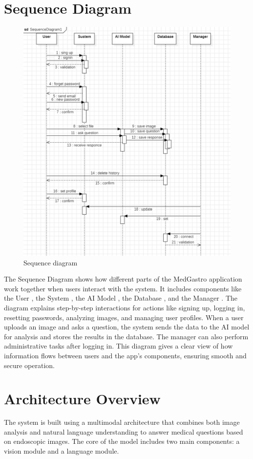 \documentclass[12pt,a4paper]{report}
\begin{document}
\section{Sequence Diagram}
\begin{figure}[H]
    \centering
    \includegraphics[width=1\linewidth]{SequenceDiagram.png}
    \caption{Sequence diagram}
    \label{fig:enter-label}
\end{figure}

The Sequence Diagram shows how different parts of the MedGastro application work together when users interact with the system. It includes components like the User , the System , the AI Model , the Database , and the Manager . The diagram explains step-by-step interactions for actions like signing up, logging in, resetting passwords, analyzing images, and managing user profiles. When a user uploads an image and asks a question, the system sends the data to the AI model for analysis and stores the results in the database. The manager can also perform administrative tasks after logging in. This diagram gives a clear view of how information flows between users and the app's components, ensuring smooth and secure operation. 

\section{Architecture Overview}
The system is built using a multimodal architecture that combines both image analysis and natural language understanding to answer medical questions based on endoscopic images. The core of the model includes two main components: a vision module and a language module.
\end{document}
